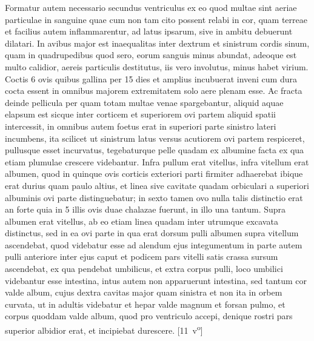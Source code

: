 \pend%
\pstart%
Formatur autem necessario secundus ventriculus ex eo quod multae sint aeriae particulae in sanguine quae cum non tam cito possent relabi in cor, quam terreae et 
facilius autem inflammarentur, ad latus ipsarum, sive in ambitu debuerunt dilatari.
\pend%
\pstart%
 In avibus major est inaequalitas inter dextrum et sinistrum cordis sinum, quam in quadrupedibus quod sero, eorum sanguis minus abundat, adeoque est multo calidior, aereis particulis destitutus, iis vero involutus, minus habet virium.
\pend%
\pstart%
Coctis 6 ovis quibus gallina per 15 dies et amplius incubuerat inveni cum dura cocta essent in omnibus majorem extremitatem solo aere plenam esse. Ac fracta deinde pellicula per quam totam multae venae spargebantur, aliquid aquae elapsum est sicque inter corticem et superiorem ovi partem aliquid spatii intercessit, in omnibus autem foetus erat in superiori parte sinistro lateri incumbens, ita scilicet ut sinistrum latus versus acutiorem ovi partem respiceret, pullusque esset incurvatus, tegebaturque pelle quadam ex albumine facta ex qua etiam plumulae crescere videbantur. Infra pullum erat vitellus, infra vitellum
erat albumen, quod in quinque ovis corticis exteriori parti firmiter adhaerebat ibique erat durius quam paulo altius, et linea sive cavitate quadam orbiculari a superiori albuminis ovi parte distinguebatur; in sexto tamen ovo nulla talis distinctio erat an forte quia in 5 illis ovis duae chalazae fuerunt, in illo una tantum. Supra albumen erat vitellus, ab eo etiam linea quadam inter utrumque excavata distinctus, sed in ea ovi parte in qua erat dorsum pulli albumen supra vitellum ascendebat, quod videbatur esse ad alendum ejus integumentum in parte autem pulli anteriore inter ejus caput et podicem pars vitelli satis crassa sursum ascendebat, ex qua pendebat umbilicus, et extra corpus pulli, loco umbilici videbantur esse intestina, intus autem non apparuerunt intestina, sed tantum cor valde album, cujus dextra cavitas major quam sinistra et non ita in orbem curvata, ut in adultis videbatur et hepar valde magnum et forsan pulmo, et corpus quoddam valde album, quod pro ventriculo accepi, denique rostri pars superior albidior erat, et incipiebat durescere.
[11~v\textsuperscript{o}]
\pend%
